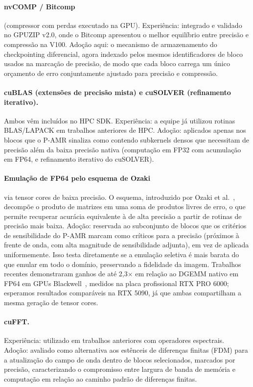 \documentclass[12pt,a4paper]{article}
\newcommand{\pamr}{P\nobreakdash-AMR}
\begin{document}
\paragraph{nvCOMP / Bitcomp} (compressor com perdas executado na GPU).
Experiência: integrado e validado no GPUZIP v2.0, onde o Bitcomp apresentou o
melhor equilíbrio entre precisão e compressão na V100. Adoção aqui: o
mecanismo de armazenamento do checkpointing diferencial, agora indexado pelos
mesmos identificadores de bloco usados na marcação de precisão, de modo que
cada bloco carrega um único orçamento de erro conjuntamente ajustado para
precisão e compressão.

\paragraph{cuBLAS (extensões de precisão mista) e cuSOLVER (refinamento
iterativo).} Ambos vêm incluídos no HPC SDK. Experiência: a equipe já utilizou
rotinas BLAS/LAPACK em trabalhos anteriores de HPC. Adoção: aplicados apenas
nos blocos que o \pamr{} sinaliza como contendo subkernels densos que
necessitam de precisão além da baixa precisão nativa (computação em FP32 com
acumulação em FP64, e refinamento iterativo do cuSOLVER).

\paragraph{Emulação de FP64 pelo esquema de Ozaki} via tensor cores de baixa
precisão. O esquema, introduzido por Ozaki et
al.~\cite{ozaki2012errorfree}, decompõe o produto de matrizes em uma soma de
produtos livres de erro, o que permite recuperar acurácia equivalente à de
alta precisão a partir de rotinas de precisão mais baixa. Adoção: reservada
ao subconjunto de blocos que os critérios de sensibilidade do \pamr{} marcam
como críticos para a precisão (próximos à frente de onda, com alta magnitude
de sensibilidade adjunta), em vez de aplicada uniformemente. Isso testa
diretamente se a emulação seletiva é mais barata do que emular em todo o
domínio, preservando a fidelidade da imagem.
Trabalhos recentes demonstraram ganhos de até 2,3$\times$ em relação ao DGEMM
nativo em FP64 em GPUs Blackwell~\cite{uchino2025ozaki}, medidos na placa
profissional RTX PRO 6000; esperamos resultados comparáveis na RTX 5090,
já que ambas compartilham a mesma geração de tensor cores.

\paragraph{cuFFT.} Experiência: utilizado em trabalhos anteriores com
operadores espectrais. Adoção: avaliado como alternativa aos estênceis de
diferenças finitas (FDM) para a atualização do campo de onda dentro de blocos
selecionados, marcados por precisão, caracterizando o compromisso entre
largura de banda de memória e computação em relação ao caminho padrão de
diferenças finitas.
\end{document}
